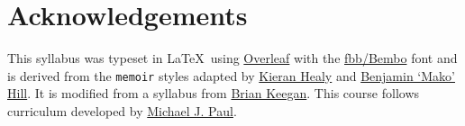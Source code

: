 \documentclass[10pt]{memoir}
\begin{document}



\section{\textbf{Acknowledgements}}

This syllabus was typeset in \LaTeX~using \href{http://www.sharelatex.com}{Overleaf} with the \href{http://www.tug.dk/FontCatalogue/fbb/}{fbb/Bembo} font and is derived from the \texttt{memoir} styles adapted by \href{https://github.com/kjhealy/latex-custom-kjh}{Kieran Healy} and \href{http://projects.mako.cc/source/?p=latex_mako;a=summary}{Benjamin `Mako' Hill}. It is modified from a syllabus from \href{https://www.brianckeegan.com/}{Brian Keegan}. This course follows curriculum developed by \href{https://cmci.colorado.edu/~mpaul/}{Michael J. Paul}.



\renewcommand{\bibsection}{\section{\huge \bibname}\prebibhook}
\baselineskip 14.2pt

\end{document}

